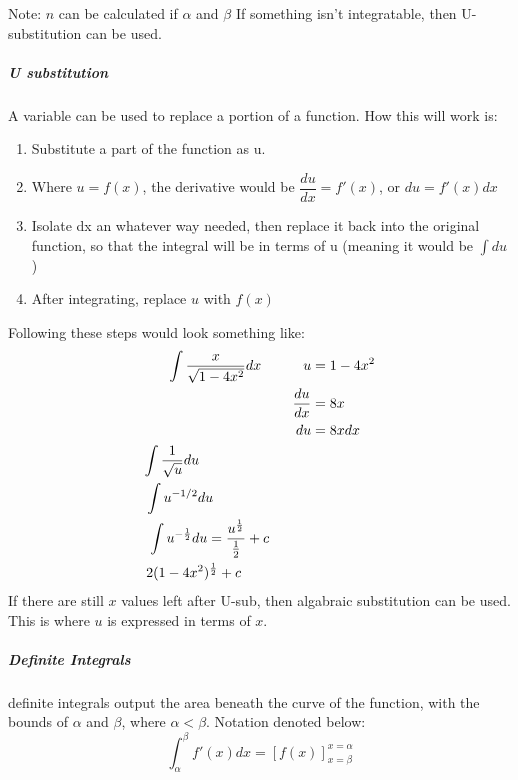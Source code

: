 \documentclass{article} %
\theoremstyle{theorem}
\theoremstyle{definition}
\begin{document}
                    Note: $n$ can be calculated if $\alpha$ and $\beta$
                    If something isn't integratable, then U-substitution can be used.
                \subparagraph{U substitution}
                    A variable can be used to replace a portion of a function. How this will work is:
                    \begin{enumerate}
                        \item Substitute a part of the function as u.
                        \item Where $u = f(x)$, the derivative would be $\dfrac{du}{dx} = f'(x)$, or $du = f'(x)dx$
                        \item Isolate dx an whatever way needed, then replace it back into the original function, so that the integral will be in terms of u (meaning it would be $\int du$)
                        \item After integrating, replace $u$ with $f(x)$
                    \end{enumerate}
                    Following these steps would look something like:
                    \begin{align*}
                        \int \dfrac{x}{\sqrt{1-4x^2}}dx \hspace{30px}
                        u &= 1-4x^2\\
                        \dfrac{du}{dx} &= 8x\\
                        du&=8xdx \\
                        \int \dfrac{1}{\sqrt{u}}du \hspace{80px}\\
                        \int u^{-1/2}du \hspace{70px}\\
                        \int u^{-\frac{1}{2}}du = \dfrac{u^{\frac{1}{2}}}{\frac{1}{2}}+c\hspace{30px}\\
                        2(1-4x^2)^{\frac{1}{2}}+c\hspace*{50px}
                    \end{align*}
                    If there are still $x$ values left after U-sub, then algabraic substitution can be used. This is where $u$ is expressed in terms of $x$.
                \subparagraph{Definite Integrals}
                    definite integrals output the area beneath the curve of the function, with the bounds of $\alpha$ and $\beta$, where $\alpha<\beta$. Notation denoted below:
                    $$\int_{\alpha}^{\beta}f'(x) dx = [f(x)]^{x=\alpha}_{x=\beta}$$ 
\end{document}
